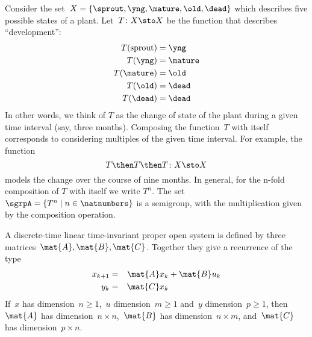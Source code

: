 
\begin{example}
  \label{plant-trafo-semigroup}
  Consider the set~$X = \{ \sprout, \yng, \mature, \old, \dead \}$ which describes five possible states of a plant. Let~$T \colon X \sto X$ be the function that describes ``development'':
  \begin{align*}
    T(\text{sprout}) &=  \yng \\
    T(\yng) &=  \mature \\
    T(\mature) &=  \old \\
    T( \old) &= \dead \\
    T (\dead) &= \dead
  \end{align*}
  In other words, we think of $T$ as the change of state of the plant during a given time interval (say, three months).
  Composing the function~$T$ with itself corresponds to considering multiples of the given time interval. For example, the function
  \begin{equation*}
    T \then T \then T \colon X \sto X
  \end{equation*}
  models the change over the course of nine months. In general, for the n-fold composition of $T$ with itself we write $T^n$.
  The set~$\sgrpA = \{ T^n \mid n \in \natnumbers \}$ is a semigroup, with the multiplication given by the composition operation.
\end{example}


  \label{ex:discrete-time-linear}
  \begin{definition}
    \label{def:dicrete-time-linear-system}
    A discrete-time linear time-invariant proper open system is defined by three matrices~$\mat{A},\mat{B},\mat{C}$.
    Together they give a recurrence of the type
    \begin{equation} \label{eq:discrete-time-dynamics}
      \begin{aligned}
        x_{k+1} &=& \mat{A} x_k & + \mat{B} u_k \\
        y_{k}   &=& \mat{C} x_k  \\
      \end{aligned}
    \end{equation}
    If~$x$ has dimension~$n\geq1$,~$u$ dimension~$m\geq1$ and~$y$ dimension~$p\geq1$, then~$\mat{A}$ has dimension~$n \times n$,~$\mat{B}$ has dimension~$n \times m$, and~$\mat{C}$ has dimension~$p \times n$.
  \end{definition}

